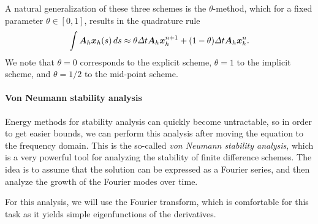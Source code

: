 A natural generalization of these three schemes is the $\theta$-method, which for a fixed parameter $\theta\in[0,1]$, results in the quadrature rule
\begin{equation}
    \int \mat A_h \vec x_h(s)\,ds \approx \theta\Delta t \mat A_h\vec x_h^{n+1} + (1-\theta)\Delta t \mat A_h \vec x_h^n.
\end{equation}
We note that $\theta=0$ corresponds to the explicit scheme, $\theta=1$ to the implicit scheme, and $\theta=1/2$ to the mid-point scheme. 
    
\paragraph{Von Neumann stability analysis}
Energy methods for stability analysis can quickly become untractable, so in order to get easier bounds, we can perform this analysis after moving the equation to the frequency domain. This is the so-called \emph{von Neumann stability analysis}, which is a very powerful tool for analyzing the stability of finite difference schemes. The idea is to assume that the solution can be expressed as a Fourier series, and then analyze the growth of the Fourier modes over time.

For this analysis, we will use the Fourier transform, which is comfortable for this task as it yields simple eigenfunctions of the derivatives. 

